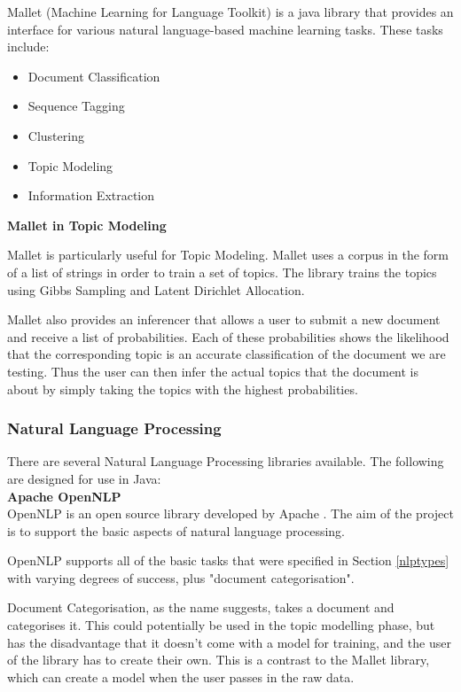 \documentclass[12pt]{article}
\begin{document}
\label{mallet}

Mallet (Machine Learning for Language Toolkit) \cite{mallet} is a java library that provides an interface for various natural language-based machine learning tasks. These tasks include:

\begin{itemize}
	\item Document Classification
	\item Sequence Tagging
	\item Clustering
	\item Topic Modeling
	\item Information Extraction \\
\end{itemize}

\textbf{Mallet in Topic Modeling}

Mallet is particularly useful for Topic Modeling. Mallet uses a corpus in the form of a list of strings in order to train a set of topics. The library trains the topics using Gibbs Sampling and Latent Dirichlet Allocation.

Mallet also provides an inferencer that allows a user to submit a new document and receive a list of probabilities. Each of these probabilities shows the likelihood that the corresponding topic is an accurate classification of the document we are testing. Thus the user can then infer the actual topics that the document is about by simply taking the topics with the highest probabilities. 
 

\subsubsection{Natural Language Processing}

\label{nlp}

There are several Natural Language Processing libraries available. The following are designed for use in Java: \\

\textbf{Apache OpenNLP} \\

OpenNLP \cite{opennlp} is an open source library developed by Apache \cite{apache}. The aim of the project is to support the basic aspects of natural language processing.

OpenNLP supports all of the basic tasks that were specified in Section \ref{nlptypes} with varying degrees of success, plus "document categorisation".

Document Categorisation, as the name suggests, takes a document and categorises it. This could potentially be used in the topic modelling phase, but has the disadvantage that it doesn't come with a model for training, and the user of the library has to create their own. This is a contrast to the Mallet library, which can create a model when the user passes in the raw data.
\end{document}
